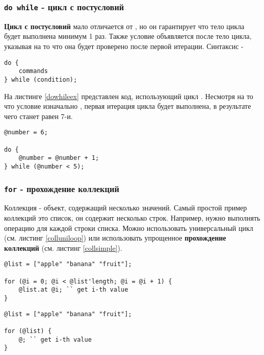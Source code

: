 \documentclass[a4paper, 14pt]{extarticle}
\begin{document}
\subsubsection{\lstinline`do while` - цикл с постусловий}

{\bf Цикл с постусловий} мало отличается от , но он гарантирует что тело цикла будет выполнена минимум 1 раз. Также условие объявляется после тело цикла, указывая на то что она будет проверено после первой итерации. Синтаксис -
\begin{lstlisting}[numbers=none]
do {
	commands
} while (condition);
\end{lstlisting}

На листинге \ref{dowhileex} представлен код, использующий цикл . Несмотря на то что условие изначально , первая итерация цикла будет выполнена, в результате чего  станет равен 7-и.

\begin{lstlisting}[caption=Цикл do while, label=dowhileex]
@number = 6;

do {
	@number = @number + 1;
} while (@number < 5);
\end{lstlisting}

\subsubsection{\lstinline`for` - прохождение коллекций}

{Коллекция} - объект, содержащий несколько значений. Самый простой пример коллекций это список, он содержит несколько строк. Например, нужно выполнять операцию для каждой строки списка. Можно использовать универсальный цикл (см. листинг \ref{colluniloop}) или использовать упрощенное {\bf прохождение коллекций} (см. листинг \ref{collsimple}).
\begin{lstlisting}[caption=Прохождение коллекций с помощью универсального цикла, label=colluniloop]
@list = ["apple" "banana" "fruit"];

for (@i = 0; @i < @list'length; @i = @i + 1) {
	@list.at @i; `` get i-th value
}
\end{lstlisting}

\begin{lstlisting}[caption=Упрощённое прохождение коллекций, label=collsimple]
@list = ["apple" "banana" "fruit"];

for (@list) {
	@; `` get i-th value
}
\end{lstlisting}
\end{document}
